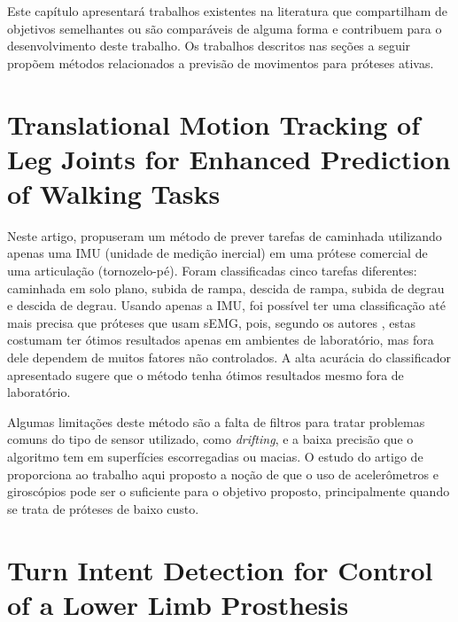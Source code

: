 Este capítulo apresentará trabalhos existentes na literatura que compartilham de objetivos semelhantes ou são comparáveis de alguma forma e contribuem para o desenvolvimento deste trabalho. Os trabalhos descritos nas seções a seguir propõem métodos relacionados a previsão de movimentos para próteses ativas.

\section{Translational Motion Tracking of Leg Joints for Enhanced Prediction of Walking Tasks}\label{sec:rel_stolyarov}

Neste artigo,  propuseram um método de prever tarefas de caminhada utilizando apenas uma IMU (unidade de medição inercial) em uma prótese comercial de uma articulação (tornozelo-pé). Foram classificadas cinco tarefas diferentes: caminhada em solo plano, subida de rampa, descida de rampa, subida de degrau e descida de degrau. Usando apenas a IMU, foi possível ter uma classificação até mais precisa que próteses que usam sEMG, pois, segundo os autores , estas costumam ter ótimos resultados apenas em ambientes de laboratório, mas fora dele dependem de muitos fatores não controlados. A alta acurácia do classificador apresentado sugere que o método tenha ótimos resultados mesmo fora de laboratório.

Algumas limitações deste método são a falta de filtros para tratar problemas comuns do tipo de sensor utilizado, como \textit{drifting}, e a baixa precisão que o algoritmo tem em superfícies escorregadias ou macias.
% 
O estudo do artigo de  proporciona ao trabalho aqui proposto a noção de que o uso de acelerômetros e giroscópios pode ser o suficiente para o objetivo proposto, principalmente quando se trata de próteses de baixo custo.

\section{Turn Intent Detection for Control of a Lower Limb Prosthesis}\label{sec:rel_pew}

